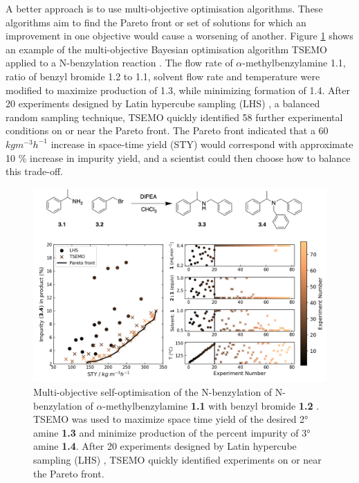 A better approach is to use multi-objective optimisation algorithms. These algorithms aim to find the Pareto front or set of solutions for which an improvement in one objective would cause a worsening of another. Figure \ref{fig:schweidtmann_example} shows an example of the multi-objective Bayesian optimisation algorithm TSEMO \cite{Bradford2018} applied to a N-benzylation reaction \cite{Schweidtmann2018}. The flow rate of $\alpha$-methylbenzylamine 1.1, ratio of benzyl bromide 1.2 to 1.1, solvent flow rate and temperature were modified to maximize production of 1.3, while minimizing formation of 1.4. After 20 experiments designed by Latin hypercube sampling (LHS) \cite{McKay1979}, a balanced random sampling technique, TSEMO quickly identified 58 further experimental conditions on or near the Pareto front. The Pareto front indicated that a 60 $kg m^{-3} h^{-1}$ increase in space-time yield (STY) would correspond with approximate 10 \% increase in impurity yield, and a scientist could then choose how to balance this trade-off.

\begin{figure}
    \centering
    \includegraphics[width=\textwidth]{gfx/Chapter03/schweidtmann_thesis.png}
    \caption{Multi-objective self-optimisation of the N-benzylation of N-benzylation of $\alpha$-methylbenzylamine \textbf{1.1} with benzyl bromide \textbf{1.2} \cite{Schweidtmann2018}. TSEMO \cite{Bradford2018} was used to maximize space time yield of the desired 2° amine \textbf{1.3} and minimize production of the percent impurity of 3° amine \textbf{1.4}. After 20 experiments designed by Latin hypercube sampling (LHS) \cite{McKay1979}, TSEMO quickly identified experiments on or near the Pareto front.}
    \label{fig:schweidtmann_example}
\end{figure}


